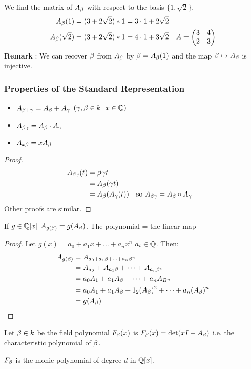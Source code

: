 \documentclass[11pt]{article}
\begin{document}
We find the matrix of $A_\beta$ with respect to the basis $\{1, \sqrt{2}\}$.
\begin{align*}
A_\beta (1) = (3+2\sqrt{2})*1 = 3\cdot1 + 2\sqrt{2}\\
	A_\beta (\sqrt{2}) = (3+2\sqrt{2})*1 = 4\cdot1 + 3\sqrt{2} &&
A = \begin{pmatrix}
	3 & 4\\
	2 & 3\\
\end{pmatrix}
\end{align*}
\spa
\textbf{Remark} : We can recover $\beta$ from $A_\beta$ by $\beta = A_\beta(1)$ and the map $\beta \mapsto A_\beta$ is injective.

\subsubsection{Properties of the Standard Representation}

\begin{itemize}
	\item{$A_{\beta+\gamma} = A_{\beta} + A_{\gamma}$ \hspace{7pt} $(\gamma, \beta \in k \hspace{7pt} x \in \mathbb{Q} )$} 
	\item{$A_{\beta\gamma} = A_{\beta} \cdot A_{\gamma}$ }
	\item{$A_{x\beta} = xA_{\beta}$ }
\end{itemize}


\begin{proof}
	\begin{align*}
 A_{\beta\gamma}(t) &= \beta\gamma t\\
		&= A_\beta(\gamma t)\\
		&= A_\beta(A_\gamma(t) )&& \text{so } A_{\beta\gamma} = A_\beta \circ A_\gamma \\
	\end{align*}
Other proofs are similar.
\end{proof}

\begin{cor}
	If $g \in \mathbb{Q}[x]$ \hspace{7pt} $ A_{g(\beta)} = g(A_\beta)$. 
	The polynomial = the linear map
\end{cor}

\begin{proof}
	Let $g(x) = a_0 + a_1x + \dots + a_nx^n $\hspace{7pt} $a_i \in \mathbb{Q}$. 
	Then:
	\begin{align*}
		A_{g(\beta)} &=A_{a_0 + a_1\beta+\dots+a_n\beta^n}\\
		&= A_{a_0} + A_{a_1\beta} + \dots + A_{a_n\beta^n}\\
		& = a_0A_1 + a_1A_\beta + \dots + a_nA_{B^n}\\
		&= a_0A_1 + a_1A_\beta+1_2(A_\beta)^2 + \dots + a_n(A_\beta)^n\\
		&= g(A_\beta)
	\end{align*}
\end{proof}
\begin{defn}
	Let $\beta \in k $ be the field polynomial $F_\beta(x)$ is $F_\beta(x) = \det(xI - A_\beta)$ i.e. the characteristic polynomial of $\beta$.
\end{defn}
\spa
$F_\beta$ is the monic polynomial of degree $d$ in $\mathbb{Q}[x]$.
\end{document}
